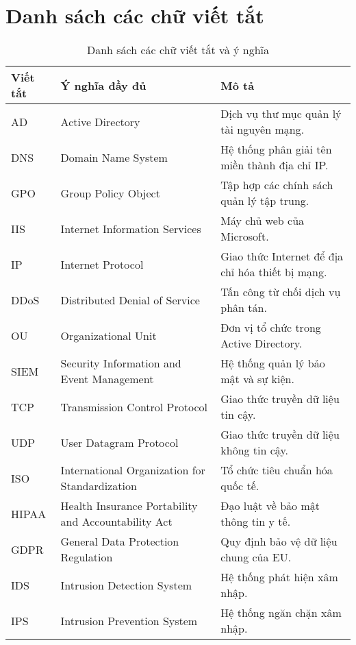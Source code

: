 \documentclass[13pt]{article}
\begin{document}
        \section*{Danh sách các chữ viết tắt}
\begin{table}[h!]
\centering
\renewcommand{\arraystretch}{1.5} %
\begin{tabularx}{\textwidth}{|l|l|X|}
\hline
\textbf{Viết tắt} & \textbf{Ý nghĩa đầy đủ} & \textbf{Mô tả} \\ \hline
AD               & Active Directory                                 & Dịch vụ thư mục quản lý tài nguyên mạng. \\ \hline
DNS              & Domain Name System                               & Hệ thống phân giải tên miền thành địa chỉ IP. \\ \hline
GPO              & Group Policy Object                              & Tập hợp các chính sách quản lý tập trung. \\ \hline
IIS              & Internet Information Services                    & Máy chủ web của Microsoft. \\ \hline
IP               & Internet Protocol                                & Giao thức Internet để địa chỉ hóa thiết bị mạng. \\ \hline
DDoS             & Distributed Denial of Service                    & Tấn công từ chối dịch vụ phân tán. \\ \hline
OU               & Organizational Unit                              & Đơn vị tổ chức trong Active Directory. \\ \hline
SIEM             & Security Information and Event Management        & Hệ thống quản lý bảo mật và sự kiện. \\ \hline
TCP              & Transmission Control Protocol                    & Giao thức truyền dữ liệu tin cậy. \\ \hline
UDP              & User Datagram Protocol                           & Giao thức truyền dữ liệu không tin cậy. \\ \hline
ISO              & International Organization for Standardization   & Tổ chức tiêu chuẩn hóa quốc tế. \\ \hline
HIPAA            & Health Insurance Portability and Accountability Act & Đạo luật về bảo mật thông tin y tế. \\ \hline
GDPR             & General Data Protection Regulation               & Quy định bảo vệ dữ liệu chung của EU. \\ \hline
IDS              & Intrusion Detection System                       & Hệ thống phát hiện xâm nhập. \\ \hline
IPS              & Intrusion Prevention System                      & Hệ thống ngăn chặn xâm nhập. \\ \hline
\end{tabularx}
\caption{Danh sách các chữ viết tắt và ý nghĩa}
\end{table}
        
\end{document}
